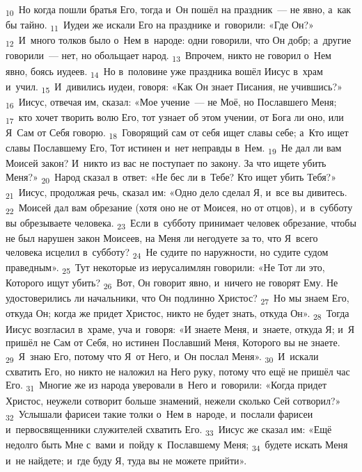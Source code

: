 \documentclass[a4paper,12pt]{article}
\begin{document}
\textsubscript{10}~Но когда пошли братья Его, тогда и~Он пошёл на праздник~--- не явно, а~как бы тайно.
\textsubscript{11}~Иудеи же искали Его на празднике и~говорили: «Где Он?»
\textsubscript{12}~И~много толков было о~Нем в~народе: одни говорили, что Он добр; а~другие говорили~--- нет, но обольщает народ.
\textsubscript{13}~Впрочем, никто не говорил о~Нем явно, боясь иудеев.
\textsubscript{14}~Но в~половине уже праздника вошёл Иисус в~храм и~учил.
\textsubscript{15}~И~дивились иудеи, говоря: «Как Он знает Писания, не учившись?»
\textsubscript{16}~Иисус, отвечая им, сказал: «Мое учение~--- не Моё, но Пославшего Меня;
\textsubscript{17}~кто хочет творить волю Его, тот узнает об этом учении, от Бога ли оно, или Я~Сам от Себя говорю.
\textsubscript{18}~Говорящий сам от себя ищет славы себе; а~Кто ищет славы Пославшему Его, Тот истинен и~нет неправды в~Нем.
\textsubscript{19}~Не дал ли вам Моисей закон? И~никто из вас не поступает по закону. За что ищете убить Меня?»
\textsubscript{20}~Народ сказал в~ответ: «Не бес ли в~Тебе? Кто ищет убить Тебя?»
\textsubscript{21}~Иисус, продолжая речь, сказал им: «Одно дело сделал Я, и~все вы дивитесь.
\textsubscript{22}~Моисей дал вам обрезание (хотя оно не от Моисея, но от отцов), и~в~субботу вы обрезываете человека.
\textsubscript{23}~Если в~субботу принимает человек обрезание, чтобы не был нарушен закон Моисеев, на Меня ли негодуете за то, что Я~всего человека исцелил в~субботу?
\textsubscript{24}~Не судите по наружности, но судите судом праведным».
\textsubscript{25}~Тут некоторые из иерусалимлян говорили: «Не Тот ли это, Которого ищут убить?
\textsubscript{26}~Вот, Он говорит явно, и~ничего не говорят Ему. Не удостоверились ли начальники, что Он подлинно Христос?
\textsubscript{27}~Но мы знаем Его, откуда Он; когда же придет Христос, никто не будет знать, откуда Он».
\textsubscript{28}~Тогда Иисус возгласил в~храме, уча и~говоря: «И знаете Меня, и~знаете, откуда Я; и~Я пришёл не Сам от Себя, но истинен Пославший Меня, Которого вы не знаете.
\textsubscript{29}~Я~знаю Его, потому что Я~от Него, и~Он послал Меня».
\textsubscript{30}~И~искали схватить Его, но никто не наложил на Него руку, потому что ещё не пришёл час Его.
\textsubscript{31}~Многие же из народа уверовали в~Него и~говорили: «Когда придет Христос, неужели сотворит больше знамений, нежели сколько Сей сотворил?»
\textsubscript{32}~Услышали фарисеи такие толки о~Нем в~народе, и~послали фарисеи и~первосвященники служителей схватить Его.
\textsubscript{33}~Иисус же сказал им: «Ещё недолго быть Мне с~вами и~пойду к~Пославшему Меня;
\textsubscript{34}~будете искать Меня и~не найдете; и~где буду Я, туда вы не можете прийти».
\end{document}
